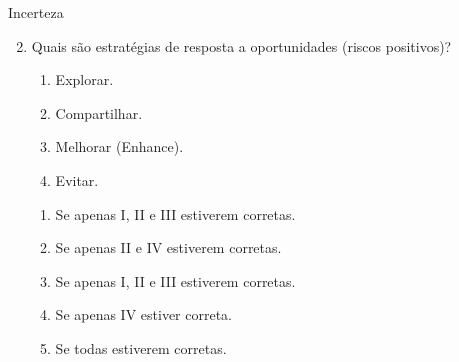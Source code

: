 \documentclass{beamer}
\begin{document}
\begin{frame}{Incerteza}
	\begin{enumerate}
		\setcounter{enumi}{1}
		\justifying
		\item Quais são estratégias de resposta a oportunidades (riscos positivos)?
		\begin{enumerate}[I]
			\item Explorar.
			\item Compartilhar.
			\item Melhorar (Enhance).
			\item Evitar.
		\end{enumerate}
		\begin{enumerate}[a]
			\item Se apenas I, II e III estiverem corretas.
			\item Se apenas II e IV estiverem corretas.
			\item \alert<2>{Se apenas I, II e III estiverem corretas.}
			\item Se apenas IV estiver correta.
			\item Se todas estiverem corretas.
		\end{enumerate}
	\end{enumerate}
\end{frame}
\end{document}
